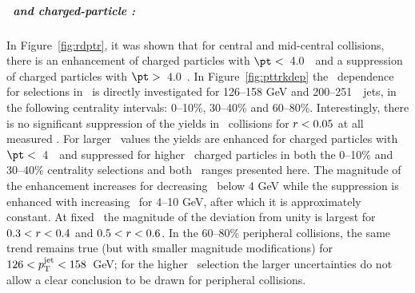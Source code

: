 \subparagraph{\RDptr\ and charged-particle \pt: }

In Figure~\ref{fig:rdptr}, it was shown that for central and mid-central collisions, there is an enhancement of charged particles with $\pt <$~4.0~\GeV\ and a suppression of charged particles with $\pt >$~4.0~\GeV.
In Figure~\ref{fig:pttrkdep} the \pt\ dependence for selections in \rvar\ is directly investigated for 126--158 GeV and 200--251~\GeV\ jets, in the following centrality intervals: 0--10\%, 30--40\% and 60--80\%.
Interestingly, there is no significant suppression of the yields in \pbpb\ collisions for $\mbox{$r$} < 0.05$ at all measured \pt.
For larger \rvar\ values the yields are enhanced for charged particles with $\pt <$~4~\GeV\ and suppressed for higher \pt\ charged particles in both the 0--10\% and 30--40\% centrality selections and both \ptjet\  ranges presented here.
The magnitude of the enhancement increases for decreasing \pt\ below 4 GeV while the suppression is enhanced with increasing \pt\ for 4--10 GeV, after which it is approximately constant.
At fixed \pt\ the magnitude of the deviation from unity is largest for $0.3< \mbox{$r$} < 0.4$ and $0.5< \mbox{$r$} < 0.6$.
In the 60--80\% peripheral collisions, the same trend remains true (but with smaller magnitude modifications) for \mbox{$126 < \mbox{$p_{\mathrm{T}}^{\mathrm{jet}}$} < 158$ GeV}; for the higher \ptjet\ selection the larger uncertainties do not allow a clear conclusion to be drawn for peripheral collisions.

